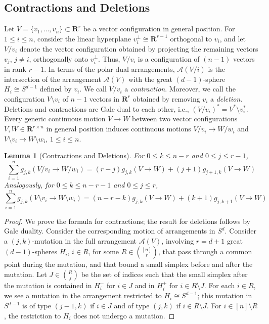 \documentclass[11pt]{article}
\newtheorem{lemma}[theorem]{Lemma}
\newcommand{\arr}{\mathcal{A}}
\renewcommand{\leq}{\leqslant}
\newcommand{\R}{\mathbf{R}}
\begin{document}
\subsection{Contractions and Deletions}
\label{sec:deletion-contraction}
Let $V=\{v_1,\dots,v_n\} \subset \R^r$ be a vector configuration in general position. For $1\leq i\leq n$, consider the linear hyperplane $v_i^\bot \cong \R^{r-1}$ orthogonal to $v_i$, and let $V/v_i$ denote the vector configuration obtained by projecting the remaining vectors $v_j$, $j\neq i$, orthogonally onto $v_i^\bot $. Thus, $V/v_i$ is a configuration of $(n-1)$ vectors in rank $r-1$. In terms of the polar dual arrangements, $\arr(V/i)$ is the intersection of the arrangement $\arr(V)$ with the great $(d-1)$-sphere $H_i\cong S^{d-1}$ defined by $v_i$. We call $V/v_i$ a \emph{contraction}.
%
Moreover, we call the configuration $V\setminus v_i$ of $n-1$ vectors in $\R^r$ obtained by removing $v_i$ a \emph{deletion}. Deletions and contractions are Gale dual to each other, i.e., $(V/v_i)^*=V^*\! \setminus \!v_i^*$.
%
Every generic continuous motion $V\to W$ between two vector configurations $V,W \in \R^{r\times n}$ in general position induces continuous motions $V/v_i \to W/w_i$ and $V\setminus v_i \to W\setminus w_i$, $1\leq i \leq n$.
%
\begin{lemma}[Contractions and Deletions]
\label{lem:g-contraction}
For $0\leq k\leq n-r$ and $0\leq j \leq r-1$,
\[
\sum_{i=1}^n g_{j,k}(V/v_i \to W/w_i)=(r-j)g_{j,k}(V\to W) + (j+1)g_{j+1,k}(V\to W)
\]
Analogously, for $0\leq k\leq n-r-1$ and $0\leq j\leq r$,
\[
\sum_{i=1}^n g_{j,k}(V \setminus  v_i \to W \setminus w_i)=(n-r-k)g_{j,k}(V\to W) + (k+1)g_{j,k+1}(V\to W)
\]
\end{lemma}
\begin{proof} We prove the formula for contractions; the result for deletions follows by Gale duality.
Consider the corresponding motion of arrangements in $S^d$. Consider a $(j,k)$-mutation in the full arrangement $\arr(V)$, involving $r=d+1$ great $(d-1)$-spheres $H_i$, $i\in R$, for some $R\in \binom{[n]}{r}$, that pass through a common point during the mutation, and that bound a small simplex before and after the mutation. Let $J\in \binom{R}{j}$ be the set of indices such that the small simplex after the mutation is contained in $H_i^-$ for $i\in J$ and in $H_i^+$ for $i\in R\setminus J$. For each $i\in R$, we see a mutation in the arrangement restricted to $H_i\cong S^{d-1}$; this mutation in $S^{d-1}$ is of type $(j-1,k)$ if $i\in J$ and of type $(j,k)$ if $i\in R\setminus J$. For $i\in [n]\setminus R$, the restriction to $H_i$ does not undergo a mutation.
\end{proof}
\end{document}
